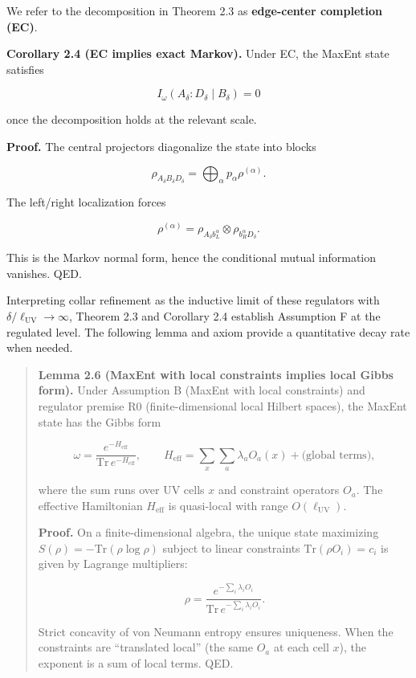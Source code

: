 \documentclass[11pt,a4paper]{article}
\theoremstyle{remark}
\begin{document}
We refer to the decomposition in Theorem 2.3 as \textbf{edge-center completion (EC)}.

\textbf{Corollary 2.4 (EC implies exact Markov).} Under EC, the MaxEnt state
satisfies

\[
I_\omega(A_\delta:D_\delta \mid B_\delta) = 0
\]

once the decomposition holds at the relevant scale.

\textbf{Proof.} The central projectors diagonalize the state into blocks

\[
\rho_{A_\delta B_\delta D_\delta}
= \bigoplus_\alpha p_\alpha \rho^{(\alpha)}.
\]

The left/right localization forces

\[
\rho^{(\alpha)} =
\rho_{A_\delta b_L^\alpha} \otimes \rho_{b_R^\alpha D_\delta}.
\]

This is the Markov normal form, hence the conditional mutual information
vanishes. QED.

Interpreting collar refinement as the inductive limit of these regulators with
\(\delta/\ell_{\mathrm{UV}} \to \infty\), Theorem 2.3 and Corollary 2.4 establish Assumption F
at the regulated level. The following lemma and axiom provide a quantitative
decay rate when needed.

\begin{quote}
\textbf{Lemma 2.6 (MaxEnt with local constraints implies local Gibbs form).}
Under Assumption B (MaxEnt with local constraints) and regulator premise R0
(finite-dimensional local Hilbert spaces), the MaxEnt state has the Gibbs form

\[
\omega = \frac{e^{-H_{\mathrm{eff}}}}{\mathrm{Tr}\,e^{-H_{\mathrm{eff}}}},
\qquad
H_{\mathrm{eff}} = \sum_x \sum_a \lambda_a O_a(x) + \text{(global terms)},
\]

where the sum runs over UV cells \(x\) and constraint operators \(O_a\). The
effective Hamiltonian \(H_{\mathrm{eff}}\) is quasi-local with range
\(O(\ell_{\mathrm{UV}})\).

\textbf{Proof.} On a finite-dimensional algebra, the unique state maximizing
\(S(\rho) = -\mathrm{Tr}(\rho \log \rho)\) subject to linear constraints
\(\mathrm{Tr}(\rho O_i) = c_i\) is given by Lagrange multipliers:

\[
\rho = \frac{e^{-\sum_i \lambda_i O_i}}{\mathrm{Tr}\,e^{-\sum_i \lambda_i O_i}}.
\]

Strict concavity of von Neumann entropy ensures uniqueness. When the
constraints are ``translated local'' (the same \(O_a\) at each cell \(x\)), the
exponent is a sum of local terms. QED.
\end{quote}
\end{document}
